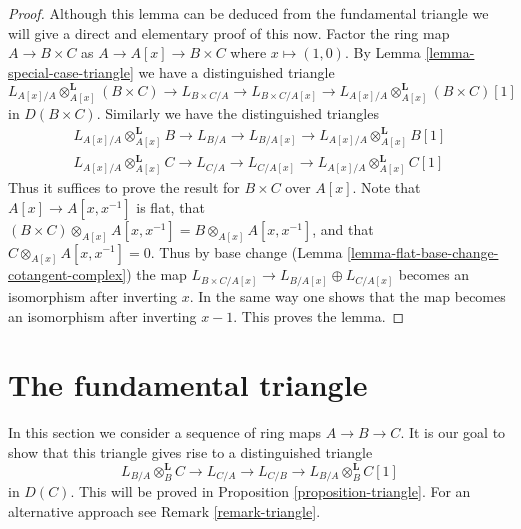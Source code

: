 \begin{proof}
Although this lemma can be deduced from the fundamental triangle
we will give a direct and elementary proof of this now.
Factor the ring map $A \to B \times C$ as $A \to A[x] \to B \times C$
where $x \mapsto (1, 0)$. By Lemma \ref{lemma-special-case-triangle}
we have a distinguished triangle
$$
L_{A[x]/A} \otimes_{A[x]}^\mathbf{L} (B \times C) \to L_{B \times C/A} \to
L_{B \times C/A[x]} \to L_{A[x]/A} \otimes_{A[x]}^\mathbf{L} (B \times C)[1]
$$
in $D(B \times C)$. Similarly we have the distinguished triangles
$$
\begin{matrix}
L_{A[x]/A} \otimes_{A[x]}^\mathbf{L} B \to L_{B/A} \to L_{B/A[x]}
\to L_{A[x]/A} \otimes_{A[x]}^\mathbf{L} B[1] \\
L_{A[x]/A} \otimes_{A[x]}^\mathbf{L} C \to L_{C/A} \to L_{C/A[x]}
\to L_{A[x]/A} \otimes_{A[x]}^\mathbf{L} C[1]
\end{matrix}
$$
Thus it suffices to prove the result for $B \times C$ over $A[x]$.
Note that $A[x] \to A[x, x^{-1}]$ is flat, that
$(B \times C) \otimes_{A[x]} A[x, x^{-1}] = B \otimes_{A[x]} A[x, x^{-1}]$,
and that $C \otimes_{A[x]} A[x, x^{-1}] = 0$.
Thus by base change (Lemma \ref{lemma-flat-base-change-cotangent-complex})
the map $L_{B \times C/A[x]} \to L_{B/A[x]} \oplus L_{C/A[x]}$
becomes an isomorphism after inverting $x$.
In the same way one shows that the map becomes an isomorphism after
inverting $x - 1$. This proves the lemma.
\end{proof}




\section{The fundamental triangle}
\label{section-triangle}

\noindent
In this section we consider a sequence of ring maps $A \to B \to C$.
It is our goal to show that this triangle gives rise to a distinguished
triangle
\begin{equation}
\label{equation-triangle}
L_{B/A} \otimes_B^\mathbf{L} C \to L_{C/A} \to L_{C/B} \to
L_{B/A} \otimes_B^\mathbf{L} C[1]
\end{equation}
in $D(C)$. This will be proved in Proposition \ref{proposition-triangle}.
For an alternative approach see Remark \ref{remark-triangle}.

